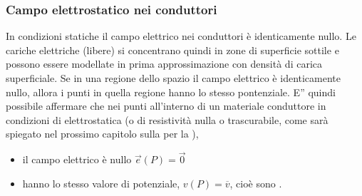 \documentclass[letterpaper,10pt,italian]{jupyterBook}
\begin{document}
\subsubsection{Campo elettrostatico nei conduttori}
\label{\detokenize{ch/electromagnetism/electrostatics:campo-elettrostatico-nei-conduttori}}\label{\detokenize{ch/electromagnetism/electrostatics:physics-hs-electromagnetism-electrostatics-e-field-media-conductors}}
\sphinxAtStartPar
In condizioni statiche il campo elettrico nei conduttori è identicamente nullo. Le cariche elettriche (libere) si concentrano quindi in zone di superficie sottile e possono essere modellate in prima approssimazione con densità di carica superficiale. Se in una regione dello spazio il campo elettrico è identicamente nullo, allora i punti in quella regione hanno lo stesso pontenziale. E” quindi possibile affermare che nei punti all’interno di un materiale conduttore in condizioni di elettrostatica (o di resistività nulla o trascurabile, come sarà spiegato nel prossimo capitolo sulla {\hyperref[\detokenize{ch/electromagnetism/electric-current:physics-hs-electromagnetism-electric-current}]{}} per la {\hyperref[\detokenize{ch/electromagnetism/electric-current:physics-hs-electromagnetism-electric-current-solids-conductor}]{}}),
\begin{itemize}
\item {} 
\sphinxAtStartPar
il campo elettrico è nullo \(\vec{e}(P) = \vec{0}\)

\item {} 
\sphinxAtStartPar
hanno lo stesso valore di potenziale, \(v(P) = \overline{v}\), cioè sono .

\end{itemize}
\end{document}
